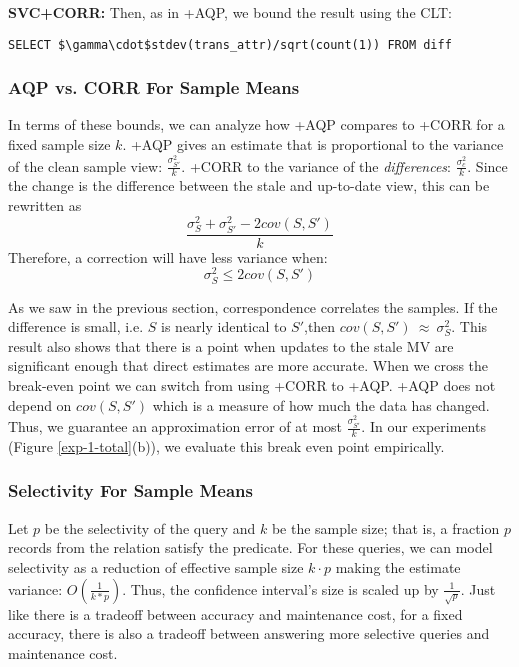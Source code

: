 \vspace{0.35em}\noindent\textbf{SVC+CORR: } Then, as in \svcnospace+AQP, we bound the result using the CLT:
\begin{lstlisting}[mathescape,basicstyle={\scriptsize}]
SELECT $\gamma\cdot$stdev(trans_attr)/sqrt(count(1)) FROM diff
\end{lstlisting}

\subsubsection{AQP vs. CORR For Sample Means}
In terms of these bounds, we can analyze how \svcnospace+AQP compares to \svcnospace+CORR for a fixed sample size $k$.
\sloppy
\svcnospace+AQP gives an estimate that is proportional to the variance of the clean sample view: 
$\frac{\sigma_{S'}^2}{k}$.
\svcnospace+CORR to the variance of the \emph{differences}: 
$\frac{\sigma_{c}^2}{k}$.
Since the change is the difference between the stale and up-to-date view, this can be rewritten as
\[\frac{\sigma_{S}^2 + \sigma_{S'}^2 - 2cov(S,S')}{k}\]
Therefore, a correction will have less variance when:
\[\sigma_{S}^2 \le 2cov(S,S')\]

As we saw in the previous section, correspondence correlates the samples.
If the difference is small, i.e. $S$ is nearly identical to $S'$,then $cov(S,S')~\approx~\sigma_{S}^2$. 
This result also shows that there is a point when updates to the stale MV are significant enough that direct estimates are more accurate.
When we cross the break-even point we can switch from using \svcnospace+CORR to \svcnospace+AQP.
\svcnospace+AQP does not depend on $cov(S,S')$ which is a measure of how much the data has changed.
Thus, we guarantee an approximation error of at most $\frac{\sigma_{S'}^2}{k}$.
In our experiments (Figure \ref{exp-1-total}(b)), we evaluate this break even point empirically. 

\subsubsection{Selectivity For Sample Means}
Let $p$ be the selectivity of the query and $k$ be the sample size; that is, a fraction $p$ records from the relation satisfy the predicate.
For these queries, we can model selectivity as a reduction of effective sample size $k\cdot p$ making the
estimate variance: $O(\frac{1}{k*p})$.
Thus, the confidence interval's size is scaled up by $\frac{1}{\sqrt{p}}$.
Just like there is a tradeoff between accuracy and maintenance cost, for a fixed accuracy, 
there is also a tradeoff between answering more selective queries and maintenance cost.

